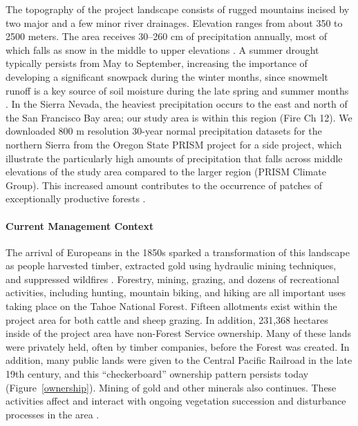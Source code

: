 The topography of the project landscape consists of rugged mountains incised by two major and a few minor river drainages. Elevation ranges from about 350 to 2500 meters. The area receives 30--260 cm of precipitation annually, most of which falls as snow in the middle to upper elevations \citep{Storer1963}. A summer drought typically persists from May to September, increasing the importance of developing a significant snowpack during the winter months, since snowmelt runoff is a key source of soil moisture during the late spring and summer months \citep{Minnich2007}. In the Sierra Nevada, the heaviest precipitation occurs to the east and north of the San Francisco Bay area; our study area is within this region (Fire Ch 12). We downloaded 800 m resolution 30-year normal precipitation datasets for the northern Sierra from the Oregon State PRISM project for a side project, which illustrate the particularly high amounts of precipitation that falls across middle elevations of the study area compared to the larger region (PRISM Climate Group). This increased amount contributes to the occurrence of patches of exceptionally productive forests \citep[][ Alan Doerr, personal communication]{Littell2012}.





\paragraph{Current Management Context}

The arrival of Europeans in the 1850s sparked a transformation of this landscape as people harvested timber, extracted gold using hydraulic mining techniques, and suppressed wildfires \citep{Storer1963}. Forestry, mining, grazing, and dozens of recreational activities, including hunting, mountain biking, and hiking are all important uses taking place on the Tahoe National Forest. Fifteen allotments exist within the project area for both cattle and sheep grazing. In addition, 231,368 hectares inside of the project area have non-Forest Service ownership. Many of these lands were privately held, often by timber companies, before the Forest was created. In addition, many public lands were given to the Central Pacific Railroad in the late 19th century, and this ``checkerboard'' ownership pattern persists today (Figure~\ref{ownership}). Mining of gold and other minerals also continues. These activities affect and interact with ongoing vegetation succession and disturbance processes in the area \citep{USDAForestService2014}.


